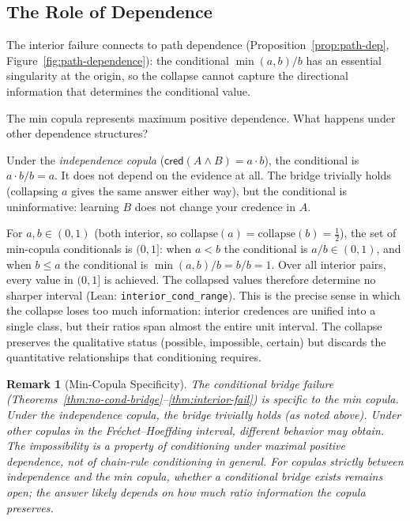 \documentclass[11pt,a4paper]{article}
\newtheorem{remark}[theorem]{Remark}
\newcommand{\cred}{\mathsf{cred}}
\begin{document}
\subsection{The Role of Dependence}
\label{sec:dependence}

The interior failure connects to path dependence
(Proposition~\ref{prop:path-dep}, Figure~\ref{fig:path-dependence}):
the conditional $\min(a,b)/b$ has an essential singularity at the
origin, so the collapse cannot capture the directional information
that determines the conditional value.

The min copula represents maximum positive dependence.
What happens under other dependence structures?

Under the \emph{independence copula}
($\cred(A \land B) = a \cdot b$), the conditional is
$a \cdot b / b = a$. It does not depend on the evidence at all.
The bridge trivially holds (collapsing $a$ gives the same answer
either way), but the conditional is uninformative: learning $B$
does not change your credence in $A$.

For $a, b \in (0,1)$ (both interior, so
$\mathrm{collapse}(a) = \mathrm{collapse}(b) = \tfrac{1}{2}$),
the set of min-copula conditionals is $(0, 1]$:
when $a < b$ the conditional is $a/b \in (0,1)$, and when
$b \leq a$ the conditional is $\min(a,b)/b = b/b = 1$.
Over all interior pairs, every value in $(0,1]$ is achieved.
The collapsed values therefore determine no sharper interval
(Lean: \texttt{interior\_cond\_range}).
This is the precise sense in which the collapse loses too much
information: interior credences are unified into a single class, but
their ratios span almost the entire unit interval.
The collapse preserves the qualitative status (possible, impossible,
certain) but discards the quantitative relationships that
conditioning requires.

\begin{remark}[Min-Copula Specificity]
\label{rem:min-copula-specific}
The conditional bridge failure
(Theorems~\ref{thm:no-cond-bridge}--\ref{thm:interior-fail})
is specific to the min copula.
Under the independence copula, the bridge trivially holds (as noted
above).
Under other copulas in the Fr\'echet--Hoeffding interval, different
behavior may obtain.
The impossibility is a property of conditioning under maximal
positive dependence, not of chain-rule conditioning in general.
For copulas strictly between independence and the min copula,
whether a conditional bridge exists remains open; the answer
likely depends on how much ratio information the copula preserves.
\end{remark}
\end{document}
